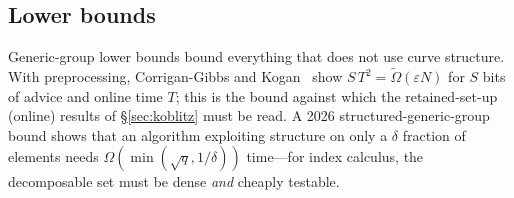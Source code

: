 \subsection{Lower bounds}

Generic-group lower bounds bound everything that does not use curve
structure. With preprocessing, Corrigan-Gibbs and
Kogan~\cite{cgk2018} show $S\,T^2=\tilde\Omega(\varepsilon N)$ for $S$ bits
of advice and online time $T$; this is the bound against which the
retained-set-up (online) results of \S\ref{sec:koblitz} must be read. A
2026 structured-generic-group bound shows that an algorithm exploiting
structure on only a $\delta$ fraction of elements needs
$\Omega(\min(\sqrt q,1/\delta))$ time---for index calculus, the
decomposable set must be dense \emph{and} cheaply testable.
